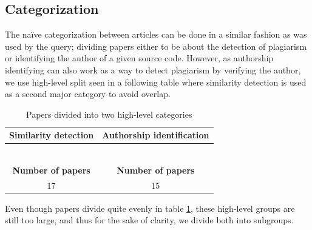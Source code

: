 \subsection{Categorization}

The naïve categorization between articles can be done in a similar fashion as was used by the query; dividing papers either to be about the detection of plagiarism or identifying the author of a given source code. However, as authorship identifying can also work as a way to detect plagiarism by verifying the author, we use high-level split seen in a following table where similarity detection is used as a second major category to avoid overlap.

\begin{table}[ht]
    \caption{Papers divided into two high-level categories}
    \label{table-highcateq}
    \centering
    \begin{tabular}{ | c | c | }
        
        \hline
        {\bf Similarity detection} & {\bf Authorship identification} \\ \hline
    
        \cite{AFAPLI2015, LICD2010, AASCPD2012} & \cite{SCAANN2017, ABEC2014, CAPSCAP2014}   \\
        \cite{Heblikar2015NormalizationBS, USCR2014, AIR2015} &  \cite{SCANG2007, EJPFSAI2004, ACSBPD2012}\\
        \cite{OTIOLSS2015, BUAA2009, ramirez2015high} &  \cite{APASCAI2007, UCMHGAAI2007, ESHPFSCAC2008}\\
        \cite{Ohmann2015, TBCFPD2012, Fu2017WASTKAW} &  \cite{AIRTSCAA2009, TSUDIJSCAI2011, DNNSCAI2013} \\
        \cite{ASTMLPD2013, AAPSCDPTK2013, CPDPPD2013}    & \cite{SCAIUFL2013, SDNAIJSP2015, AISC2017} \\
        \cite{PACASCD2005, RCISCP2017} &  \\ \hline
        {\bf Number of papers} & {\bf Number of papers} \\ \hline
        17 & 15 \\ \hline
    \end{tabular}
\end{table}

\noindent
Even though papers divide quite evenly in table \ref{table-highcateq}, these high-level groups are still too large, and thus for the sake of clarity, we divide both into subgroups.

